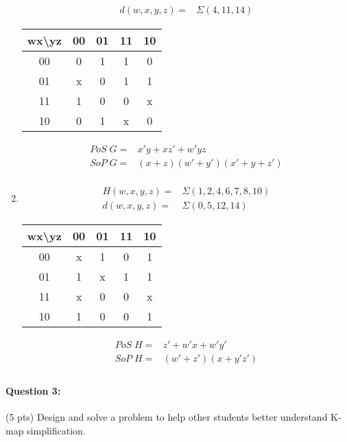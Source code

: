 \documentclass[12pt,letterpaper,titlepage]{report}
\begin{document}
\begin{raggedright}
\begin{multicols*}{2}
\begin{enumerate}[noitemsep, label=\alph*)]
\begin{align*}
		d(w,x,y,z) =& \Sigma(4,11,14)
	  \end{align*}
\begin{center}
\begin{tabular}{|c||c|c|c|c|}\hline
wx\textbackslash yz
   & 00 & 01 & 11 & 10 \\\hline\hline
00 &  0 &  1 &  1 &  0 \\\hline
01 &  x &  0 &  1 &  1 \\\hline 
11 &  1 &  0 &  0 &  x \\\hline
10 &  0 &  1 &  x &  0 \\\hline
\end{tabular}
\end{center}
\begin{align*}
   PoS\; G =& x'y+xz'+w'yz\\
   SoP\; G =& (x+z)(w'+y')(x'+y+z')\\
\end{align*}
\columnbreak
\item \begin{align*}
		H(w,x,y,z) =& \Sigma(1,2,4,6,7,8,10)\\
		d(w,x,y,z) =& \Sigma(0,5,12,14)
	  \end{align*}
\begin{center}
\begin{tabular}{|c||c|c|c|c|}\hline
wx\textbackslash yz
   & 00 & 01 & 11 & 10 \\\hline\hline
00 &  x &  1 &  0 &  1 \\\hline
01 &  1 &  x &  1 &  1 \\\hline 
11 &  x &  0 &  0 &  x \\\hline
10 &  1 &  0 &  0 &  1 \\\hline
\end{tabular}
\end{center}
\begin{align*}
   PoS\; H =& z'+w'x+w'y'\\
   SoP\; H =& (w'+z')(x+y'z')\\
\end{align*}
\end{enumerate}
\end{multicols*}
\pagebreak

\paragraph{Question 3:} 
(5 pts) Design and solve a problem to help other students better understand K‐map simplification. 


\end{raggedright}
\end{document}
